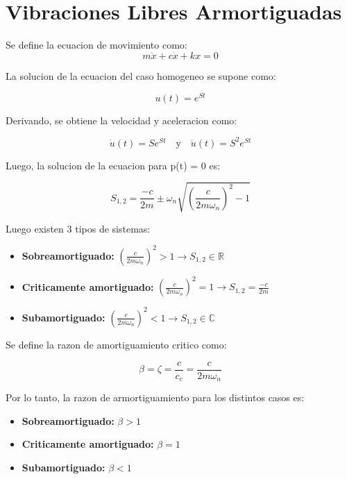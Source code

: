 \documentclass{article}  %
\begin{document}
\newpage
\section{Vibraciones Libres Armortiguadas}

Se define la ecuacion de movimiento como:
\begin{equation}
    m \ddot{x} + c \dot{x} + kx = 0
\end{equation}

La solucion de la ecuacion del caso homogeneo se supone como:

\begin{equation}
    u(t) = e^{St}
\end{equation}

Derivando, se obtiene la velocidad y aceleracion como:

\begin{equation}
    \dot{u}(t) = Se^{St} \quad \text{y} \quad \ddot{u}(t) = S^2 e^{St}
\end{equation}

Luego, la solucion de la ecuacion para p(t) = 0 es:

\begin{equation}
    S_{1,2} =  \frac{-c}{2m} \pm \omega_n \sqrt{(\frac{c}{2m\omega_n})^2 - 1}
\end{equation}

Luego existen 3 tipos de sistemas:
\begin{itemize}
    \item \textbf{Sobreamortiguado:} $(\frac{c}{2m\omega_n})^2 > 1 \rightarrow S_{1,2} \in \mathbb{R}$ 
    \item \textbf{Criticamente amortiguado:} $(\frac{c}{2m\omega_n})^2 = 1  \rightarrow S_{1,2} = \frac{-c}{2m}$
    \item \textbf{Subamortiguado:} $(\frac{c}{2m\omega_n})^2 < 1 \rightarrow S_{1,2} \in \mathbb{C}$
\end{itemize}

Se define la razon de amortiguamiento critico como:

\begin{equation}
    \beta = \zeta = \frac{c}{c_c} = \frac{c}{2m\omega_n}
\end{equation}

Por lo tanto, la razon de armortiguamiento para los distintos casos es:

\begin{itemize}
    \item \textbf{Sobreamortiguado:} $\beta > 1$
    \item \textbf{Criticamente amortiguado:} $\beta = 1$
    \item \textbf{Subamortiguado:} $\beta < 1$
\end{itemize}
\end{document}
